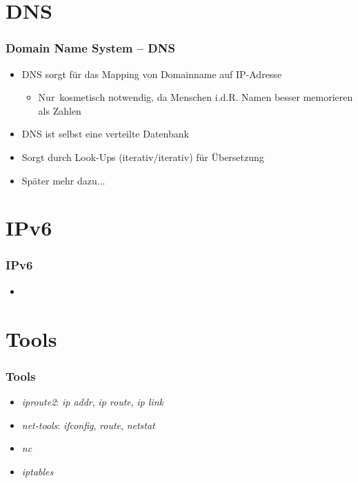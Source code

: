 \documentclass[xcolor=dvipsnames, aspectratio=169]{beamer}
\begin{document}
\section{DNS}
\begin{frame}
	\frametitle{Domain Name System -- DNS}
	\begin{itemize}
		\item DNS sorgt für das Mapping von Domainname auf IP-Adresse
		\begin{itemize}
			\item \glqq Nur\grqq\ kosmetisch notwendig, da Menschen i.d.R. Namen besser memorieren als Zahlen
		\end{itemize}
		\item DNS ist selbst eine verteilte Datenbank
		\item Sorgt durch Look-Ups (iterativ/iterativ) für Übersetzung
		\item Später mehr dazu...
	\end{itemize}
\end{frame}

\section{IPv6}
\begin{frame}
	\frametitle{IPv6}
	\begin{itemize}
		\item 
	\end{itemize}
\end{frame}

\section{Tools}
\begin{frame}
	\frametitle{Tools}
	\begin{itemize}
		\item \emph{iproute2}: \emph{ip addr}, \emph{ip route}, \emph{ip link} 
		\item \emph{net-tools}: \emph{ifconfig}, \emph{route}, \emph{netstat}
		\item \emph{nc}
		\item \emph{iptables}
	\end{itemize}
\end{frame}
\end{document}

